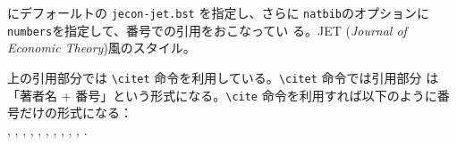 \documentclass[10pt]{jarticle}
\begin{document}
\verb|| にデフォールトの \verb|jecon-jet.bst| を指定し、さらに
\verb|natbib|のオプションに\verb|numbers|を指定して、番号での引用をおこなってい
る。JET (\textit{Journal of Economic Theory})風のスタイル。
\vspace{1em}\\



\vspace{1em}

上の引用部分では \verb|\citet| 命令を利用している。\verb|\citet| 命令では引用部分
は「著者名 + 番号」という形式になる。\verb|\cite| 命令を利用すれば以下のように番
号だけの形式になる：\\
\cite{40020418914}, \cite{yamazaki13:_japan},
\cite{takeda2013jecon}, \cite{Takeda2012a}, \cite{arimura-takeda2012},
\cite{matloff__2012}, \cite{Boswell-2012}, \cite{takeda2012_cge},
\cite{Takeda2014a}, \cite{takeda2019a}, \cite{40018847518}.

\nocite{*}


% 

%

\end{document}
